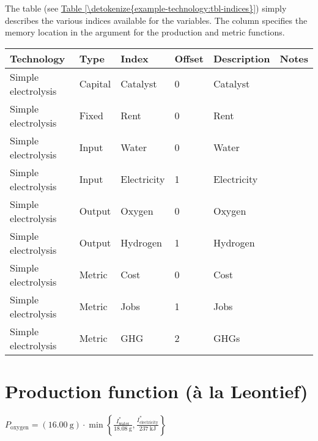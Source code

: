 \documentclass[letterpaper,10pt,english]{sphinxmanual}
\begin{document}
The  table (see \hyperref[\detokenize{example-technology:tbl-indices}]{Table \ref{\detokenize{example-technology:tbl-indices}}}) simply describes the various
indices available for the variables. The  column specifies the
memory location in the argument for the production and metric functions.


\begin{savenotes}\sphinxattablestart
\centering
{}
\sphinxthecaptionisattop
{}\label{\detokenize{example-technology:table-3}}\label{\detokenize{example-technology:tbl-indices}}
\sphinxaftertopcaption
\begin{tabulary}{\linewidth}[t]{|T|T|T|T|T|T|}
\hline
\sphinxstyletheadfamily 
Technology
&\sphinxstyletheadfamily 
Type
&\sphinxstyletheadfamily 
Index
&\sphinxstyletheadfamily 
Offset
&\sphinxstyletheadfamily 
Description
&\sphinxstyletheadfamily 
Notes
\\
\hline
Simple electrolysis
&
Capital
&
Catalyst
&
0
&
Catalyst
&\\
\hline
Simple electrolysis
&
Fixed
&
Rent
&
0
&
Rent
&\\
\hline
Simple electrolysis
&
Input
&
Water
&
0
&
Water
&\\
\hline
Simple electrolysis
&
Input
&
Electricity
&
1
&
Electricity
&\\
\hline
Simple electrolysis
&
Output
&
Oxygen
&
0
&
Oxygen
&\\
\hline
Simple electrolysis
&
Output
&
Hydrogen
&
1
&
Hydrogen
&\\
\hline
Simple electrolysis
&
Metric
&
Cost
&
0
&
Cost
&\\
\hline
Simple electrolysis
&
Metric
&
Jobs
&
1
&
Jobs
&\\
\hline
Simple electrolysis
&
Metric
&
GHG
&
2
&
GHGs
&\\
\hline
\end{tabulary}
\par
\sphinxattableend\end{savenotes}


\section{Production function (à la Leontief)}
\label{\detokenize{example-technology:production-function-a-la-leontief}}
\(P_\mathrm{oxygen} = \left( 16.00~\mathrm{g} \right) \cdot \min \left\{ \frac{I^*_\mathrm{water}}{18.08~\mathrm{g}}, \frac{I^*_\mathrm{electricity}}{237~\mathrm{kJ}} \right\}\)
\end{document}
